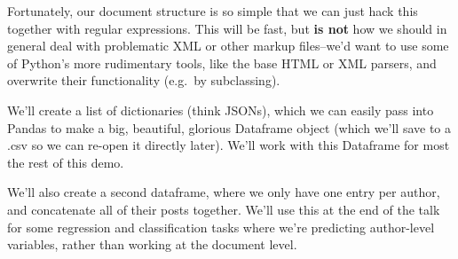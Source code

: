 \documentclass[11pt]{article}
\begin{document}
Fortunately, our document structure is so simple that we can just hack
this together with regular expressions. This will be fast, but
\textbf{is not} how we should in general deal with problematic XML or
other markup files--we'd want to use some of Python's more rudimentary
tools, like the base HTML or XML parsers, and overwrite their
functionality (e.g.~by subclassing).

We'll create a list of dictionaries (think JSONs), which we can easily
pass into Pandas to make a big, beautiful, glorious Dataframe object
(which we'll save to a .csv so we can re-open it directly later). We'll
work with this Dataframe for most the rest of this demo.

We'll also create a second dataframe, where we only have one entry per
author, and concatenate all of their posts together. We'll use this at
the end of the talk for some regression and classification tasks where
we're predicting author-level variables, rather than working at the
document level.
\end{document}
